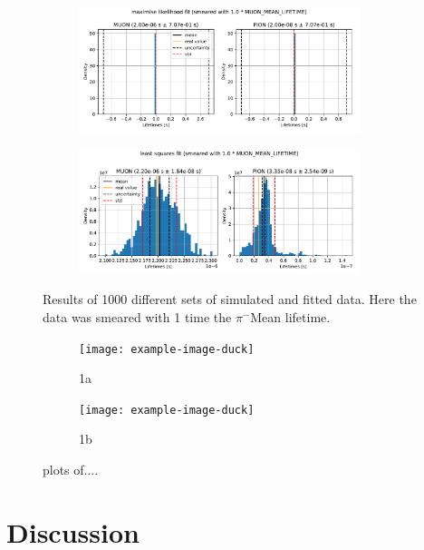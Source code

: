 \documentclass[11pt, a4paper, oneside]{book}
\newcommand\DoublePlotwidth{0.9}
\newcommand{\pion}{$\pi^{-}$}
\begin{document}
\begin{figure}[h]
\begin{subfigure}{\textwidth}
  \centering
  \includegraphics[width=\DoublePlotwidth\textwidth]{images/4b_hist_2_likelihood.pdf}
\end{subfigure}

\begin{subfigure}{\textwidth}
  \centering
  \includegraphics[width=\DoublePlotwidth\textwidth]{images/4b_hist_2_squares.pdf}
\end{subfigure}
\caption{Results of 1000 different sets of simulated and fitted data. Here the data was smeared with 1 time the \pion Mean lifetime.}
\label{fig:results_smeared_2}
\end{figure}

\begin{figure}[h]
\begin{subfigure}{\textwidth}
  \centering
  \texttt{[image: example-image-duck]}
  \caption{1a}
\end{subfigure}

\begin{subfigure}{\textwidth}
  \centering
  \texttt{[image: example-image-duck]}
  \caption{1b}
\end{subfigure}
\caption{plots of....}
\label{fig:fig}
\end{figure}

\chapter{Discussion}


\end{document}
